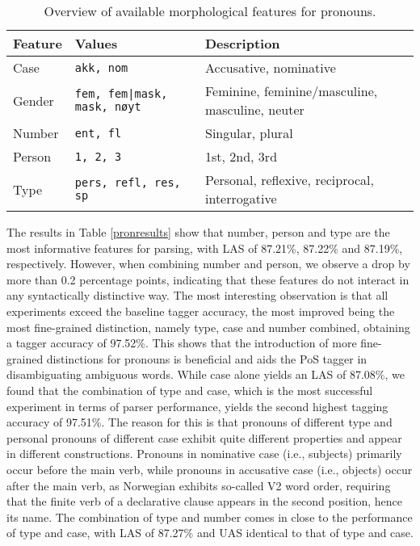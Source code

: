 \documentclass[a4paper,12pt,english]{book}
\begin{document}
\begin{table}
    \centering
    \smaller[0.5]
    \begin{tabular}{@{}lp{5cm}p{5cm}@{}}
        \toprule
        \textbf{Feature} & \textbf{Values} & \textbf{Description} \\
        \midrule
        Case & \texttt{akk, nom} & Accusative, nominative \\
        Gender & \texttt{fem, fem|mask, mask, nøyt} & Feminine,
        feminine/masculine, masculine, neuter \\
        Number & \texttt{ent, fl} & Singular, plural \\
        Person & \texttt{1, 2, 3} & 1st, 2nd, 3rd \\
        Type & \texttt{pers, refl, res, sp} & Personal, reflexive, reciprocal,
        interrogative \\
        \bottomrule
    \end{tabular}
    \caption{Overview of available morphological features for pronouns.}
    \label{pronfeatures}
\end{table}

The results in Table \ref{pronresults} show that number, person and type are
the most informative features for parsing, with LAS of 87.21\%, 87.22\% and
87.19\%, respectively. However, when combining number and person, we observe a
drop by more than 0.2 percentage points, indicating that these features do not
interact in any syntactically distinctive way. The most interesting observation
is that all experiments exceed the baseline tagger accuracy, the most improved
being the most fine-grained distinction, namely type, case and number combined,
obtaining a tagger accuracy of 97.52\%. This shows that the introduction of
more fine-grained distinctions for pronouns is beneficial and aids the PoS
tagger in disambiguating ambiguous words. While case alone yields an LAS of
87.08\%, we found that the combination of type and case, which is the most
successful experiment in terms of parser performance, yields the second highest
tagging accuracy of 97.51\%. The reason for this is that pronouns of different
type and personal pronouns of different case exhibit quite different properties
and appear in different constructions. Pronouns in nominative case (i.e.,
subjects) primarily occur before the main verb, while pronouns in accusative
case (i.e., objects) occur after the main verb, as Norwegian exhibits so-called
V2 word order, requiring that the finite verb of a declarative clause appears
in the second position, hence its name. The combination of type and number
comes in close to the performance of type and case, with LAS of 87.27\% and UAS
identical to that of type and case.
\end{document}

